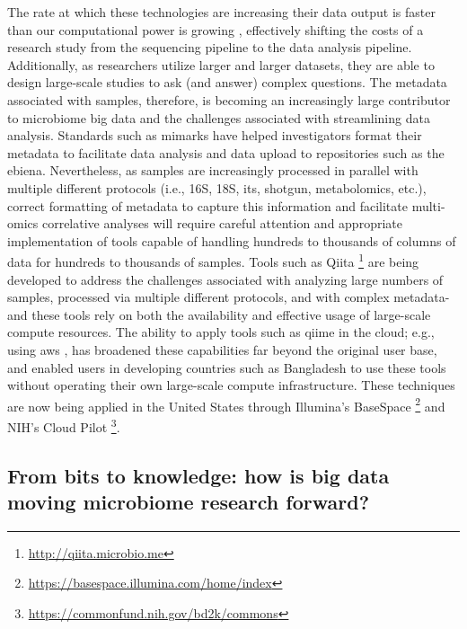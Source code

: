 The rate at which these technologies are increasing their data output is faster than our computational power is growing \cite{Wetterstrand2013}, effectively shifting the costs of a research study from the sequencing pipeline to the data analysis pipeline. Additionally, as researchers utilize larger and larger datasets, they are able to design large-scale studies to ask (and answer) complex questions. The metadata associated with samples, therefore, is becoming an increasingly large contributor to microbiome big data and the challenges associated with streamlining data analysis. Standards such as \gls{mimarks} \cite{Yilmaz2011} have helped investigators format their metadata to facilitate data analysis and data upload to repositories such as the \gls{ebiena}. Nevertheless, as samples are increasingly processed in parallel with multiple different protocols (i.e., 16S, 18S, \gls{its}, shotgun, metabolomics, etc.), correct formatting of metadata to capture this information and facilitate multi-omics correlative analyses will require careful attention and appropriate implementation of tools capable of handling hundreds to thousands of columns of data for hundreds to thousands of samples. Tools such as Qiita \footnote{\label{qiitaurl}\url{http://qiita.microbio.me}} are being developed to address the challenges associated with analyzing large numbers of samples, processed via multiple different protocols, and with complex metadata-and these tools rely on both the availability and effective usage of large-scale compute resources. The ability to apply tools such as \gls{qiime} in the cloud; e.g., using \gls{aws} \cite{Ragan-Kelley2013}, has broadened these capabilities far beyond the original user base, and enabled users in developing countries such as Bangladesh to use these tools without operating their own large-scale compute infrastructure. These techniques are now being applied in the United States through Illumina's BaseSpace \footnote{\label{basespaceurl}\url{https://basespace.illumina.com/home/index}} and NIH's Cloud Pilot \footnote{\label{cloudpiloturl}\url{https://commonfund.nih.gov/bd2k/commons}}.

\subsection{From bits to knowledge: how is big data moving microbiome research forward?}

